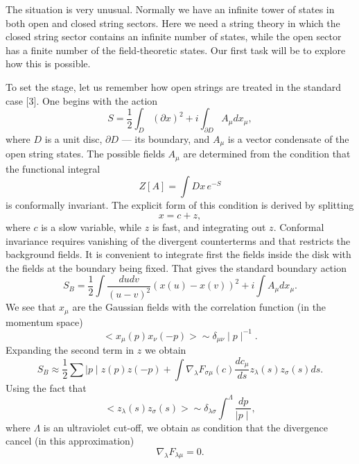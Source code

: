 \documentclass[a4paper,12pt]{article}
\begin{document}
The situation is very unusual. Normally we have an infinite tower of states
in both open and closed string sectors. Here we need a string theory in
which the closed string sector contains an infinite number of states, while
the open sector has a finite number of the field-theoretic states. Our first
task will be to explore how this is possible.

To set the stage, let us remember how open strings are treated in the
standard case [3]. One begins with the action 
\begin{equation}
S=\frac{1}{2}\int_{D}(\partial x)^{2}+i\int_{\partial D}A_{\mu }dx_{\mu },
\end{equation}
where $D$ is a unit disc, $\partial D$ --- its boundary, and $A_{\mu }$ is a
vector condensate of the open string states. The possible fields $A_{\mu }$
are determined from the condition that the functional integral 
\begin{equation}
Z[A]=\int Dx\,e^{-S}
\end{equation}
is conformally invariant. The explicit form of this condition is derived by
splitting 
\begin{equation}
x=c+z,
\end{equation}
where $c$ is a slow variable, while $z$ is fast, and integrating out $z$.
Conformal invariance requires vanishing of the divergent counterterms and
that restricts the background fields. It is convenient to integrate first
the fields inside the disk with the fields at the boundary being fixed. That
gives the standard boundary action 
\begin{equation}
S_{B}=\frac{1}{2}\int \frac{dudv}{(u-v)^{2}}(x(u)-x(v))^{2}+i\int A_{\mu
}dx_{\mu }.
\end{equation}
We see that $x_{\mu }$ are the Gaussian fields with the correlation
function (in the momentum space) 
\begin{equation}
<x_{\mu }(p)x_{\nu }(-p)>\sim \delta _{\mu \nu }\mid p\mid ^{-1}.
\end{equation}
Expanding the second term in $z$ we obtain 
\begin{equation}
S_{B}\approx \frac{1}{2}\sum \mid p\mid z(p)z(-p)+\int \nabla _{\lambda
}F_{\sigma \mu }(c)\frac{dc_{\mu }}{ds}z_{\lambda }(s)z_{\sigma }(s)ds.
\end{equation}
Using the fact that 
\begin{equation}
<z_{\lambda }(s)z_{\sigma }(s)>\sim \delta _{\lambda \sigma }\int^{\Lambda }%
\frac{dp}{\mid p\mid },
\end{equation}
where $\Lambda $ is an ultraviolet cut-off, we obtain as condition that the
divergence cancel (in this approximation) 
\begin{equation}
\nabla _{\lambda }F_{\lambda \mu }=0.
\end{equation}
\end{document}
